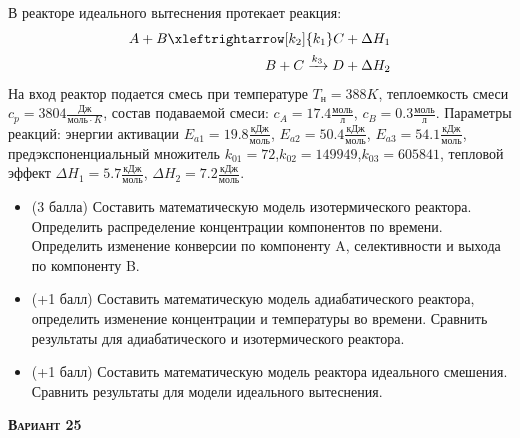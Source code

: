  В реакторе идеального вытеснения протекает реакция: \begin{equation*} \begin{aligned} A+B \xleftrightarrow[k_2]{k_1} C + \Delta H_1 \\ B + C \xrightarrow{k_3} D + \Delta H_2 \end{aligned} \end{equation*}                                На вход  реактор подается смесь при температуре $ T_н =  388 K$, теплоемкость смеси $c_p= 3804 \frac{Дж}{моль \cdot K}$, состав подаваемой смеси: $c_A=17.4 \frac{моль}{л}$, $c_B=0.3 \frac{моль}{л}$. Параметры реакций: энергии активации $E_{a1}=19.8 \frac{кДж}{моль}$, $E_{a2}=50.4  \frac{кДж}{моль}$, $E_{a3}=54.1  \frac{кДж}{моль}$, предэкспоненциальный множитель $k_{01}=        72$,$k_{02}=    149949$,$k_{03}=    605841$, тепловой эффект $\Delta H_1=  5.7  \frac{кДж}{моль}$, $\Delta H_2= 7.2 \frac{кДж}{моль}$.\begin{itemize} \item (3 балла) Составить математическую модель изотермического реактора. Определить распределение концентрации компонентов по времени. Определить изменение конверсии по компоненту A, селективности и выхода по компоненту B. \item (+1 балл) Составить математическую модель адиабатического реактора, определить изменение концентрации и температуры во времени. Сравнить результаты для адиабатического и изотермического реактора. \item (+1 балл) Составить математическую модель реактора идеального смешения. Сравнить результаты для модели идеального вытеснения. \end{itemize}

\textsc{\textbf{Вариант 25}}

